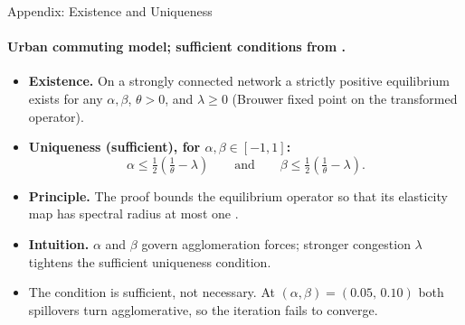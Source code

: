 \documentclass[11pt,aspectratio=169]{beamer}
\newcommand{\navback}[1]{\par\vspace{0.35em}\noindent\hfill\hyperlink{#1}{\beamerreturnbutton{back}}}
\begin{document}
\begin{frame}[label=appexist]{Appendix: Existence and Uniqueness}
\framesubtitle{Urban commuting model; sufficient conditions from \citet[Proposition~1]{allenarkolakis2022}.}
\small
\begin{itemize}
  \item \textbf{Existence.} On a strongly connected network a strictly positive equilibrium exists for any $\alpha,\beta$, $\theta>0$, and $\lambda\ge0$ (Brouwer fixed point on the transformed operator).
  \item \textbf{Uniqueness (sufficient), for $\alpha,\beta\in[-1,1]$:}
  \vspace{-0.15em}\[
    \alpha\le\tfrac12\!\left(\tfrac1\theta-\lambda\right)
    \qquad\text{and}\qquad
    \beta\le\tfrac12\!\left(\tfrac1\theta-\lambda\right).
  \]
  \item \textbf{Principle.} The proof bounds the equilibrium operator so that its elasticity map has spectral radius at most one \citep{allenarkolakisli2020,karlin1967}.
  \item \textbf{Intuition.} $\alpha$ and $\beta$ govern agglomeration forces; stronger congestion $\lambda$ tightens the sufficient uniqueness condition.
  \item The condition is sufficient, not necessary. At $(\alpha,\beta)=(0.05,\,0.10)$ both spillovers turn agglomerative, so the iteration fails to converge.
\end{itemize}
\navback{equilibrium}
\end{frame}

\end{document}
